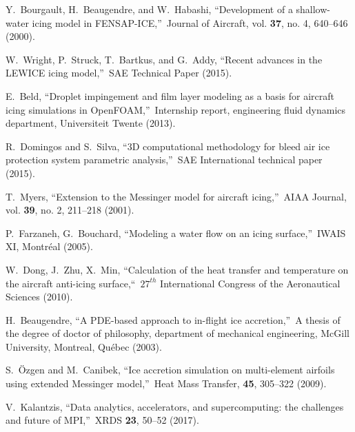 \documentclass[
11pt,%
tightenlines,%
twoside,%
onecolumn,%
nofloats,%
nobibnotes,%
nofootinbib,%
superscriptaddress,%
noshowpacs,%
centertags]%
{revtex4}
\begin{document}
\begin{thebibliography}{99}

Y.~Bourgault, H.~Beaugendre, and W.~Habashi, \textquotedblleft Development of a shallow-water icing model in FENSAP-ICE,\textquotedblright \ Journal of Aircraft, vol. \textbf{37}, no. 4, 640--646 (2000).

W.~Wright, P.~Struck, T.~Bartkus, and G.~Addy, \textquotedblleft Recent advances in the LEWICE icing model,\textquotedblright \ SAE Technical Paper (2015).

E.~Beld, \textquotedblleft Droplet impingement and film layer modeling as a basis for aircraft icing simulations in OpenFOAM,\textquotedblright \ Internship report, engineering fluid dynamics department, Universiteit Twente (2013).

R.~Domingos and S.~Silva, \textquotedblleft 3D computational methodology for bleed air ice protection system parametric analysis,\textquotedblright \ SAE International technical paper (2015).

T.~Myers, \textquotedblleft Extension to the Messinger model for aircraft icing,\textquotedblright \ AIAA Journal, vol. \textbf{39}, no. 2, 211--218 (2001).

P.~Farzaneh, G.~Bouchard, \textquotedblleft Modeling a water flow on an icing surface,\textquotedblright \ IWAIS XI, Montr\'eal (2005).

W.~Dong, J.~Zhu, X.~Min, \textquotedblleft Calculation of the heat transfer and temperature on the aircraft anti-icing surface,\textquotedblleft \ $27^{th}$ International Congress of the Aeronautical Sciences (2010).

H.~Beaugendre, \textquotedblleft A PDE-based approach to in-flight ice accretion,\textquotedblright \ A thesis of the degree of doctor of philosophy, department of mechanical engineering, McGill University, Montreal, Qu\'ebec (2003).

S.~\"Ozgen and M.~Canibek, \textquotedblleft Ice accretion simulation on multi-element airfoils using extended Messinger model,\textquotedblright \ Heat Mass Transfer, \textbf{45}, 305--322 (2009).

V.~Kalantzis, \textquotedblleft Data analytics, accelerators, and supercomputing: the challenges and future of MPI,\textquotedblright \ XRDS {\bf 23}, 50--52 (2017).


\end{thebibliography}
\end{document}
